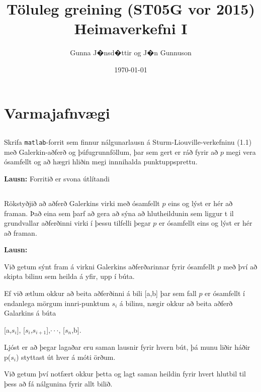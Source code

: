 \documentclass[11pt,a4paper,titlepage]{article}
\title{Töluleg greining (ST05G vor 2015)\\
Heimaverkefni I}
\date{\today}
\author{Gunna J�nsd�ttir og J�n Gunnuson}
\begin{document}
\section{Varmajafnvægi}
\subsection{}
Skrifa \verb|matlab|-forrit sem finnur nálgunarlausn á Sturm-Liouville-verkefninu (1.1) með Galerkin-aðferð og þúfugrunnföllum, þar sem gert er ráð fyrir að $p$ megi vera ósamfellt og að hægri hliðin megi innnihalda punktuppsprettu.

\textbf{Lausn:} 
Forritið er svona útlítandi







\subsection{}
Rökstyðjið að aðferð Galerkins virki með ósamfellt $p$ eins og lýst er hér að framan. Það eina sem þarf að gera að sýna að hlutheildunin sem liggur t il grundvallar aðferðinni virki í þessu tilfelli þegar $p$ er ósamfellt eins og lýst er hér að framan. 
\par

\textbf{Lausn:} \par

Við getum sýnt fram á virkni Galerkins aðferðarinnar fyrir ósamfellt $p$ með því að skipta bilinu sem heilda á yfir, upp í búta.\par
Ef við ætlum okkur að beita aðferðinni á bili [a,b] þar sem fall $p$ er ósamfellt í endanlega mörgum innri-punktum $s_{i}$ á bilinu, nægir okkur að beita aðferð Galarkins á búta\par \begin{center}[a,$s_{i}$], [$s_{i}$,$s_{i+1}$],$\cdot \cdot \cdot$, [$s_{n}$,b].\end{center}
Ljóst er að þegar lagaðar eru saman lausnir fyrir hvern bút, þá munu liðir háðir p($s_{i}$) styttast út hver á móti örðum.\par
Við getum því notfært okkur þetta og lagt saman heildin fyrir hvert hlutbil til þess að fá nálgunina fyrir allt bilið.
\end{document}
